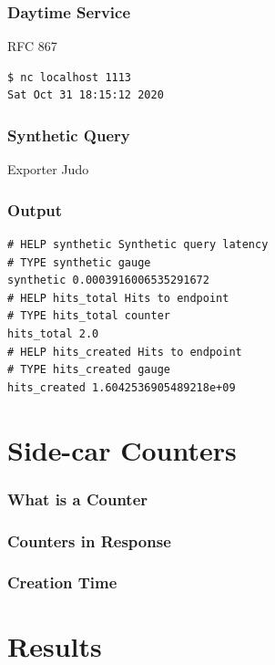 \begin{frame}[fragile]
\frametitle{Daytime Service}
RFC 867\pause

\begin{lstlisting}
$ nc localhost 1113
Sat Oct 31 18:15:12 2020
\end{lstlisting}

\end{frame}

\begin{frame}[fragile]
\frametitle{Synthetic Query}
Exporter Judo\pause



\end{frame}

\begin{frame}[fragile]
\frametitle{Output}

\begin{lstlisting}
# HELP synthetic Synthetic query latency
# TYPE synthetic gauge
synthetic 0.0003916006535291672
# HELP hits_total Hits to endpoint
# TYPE hits_total counter
hits_total 2.0
# HELP hits_created Hits to endpoint
# TYPE hits_created gauge
hits_created 1.6042536905489218e+09
\end{lstlisting}

\end{frame}

\section{Side-car Counters}

\begin{frame}
\frametitle{What is a Counter}
\end{frame}

\begin{frame}
\frametitle{Counters in Response}
\end{frame}

\begin{frame}
\frametitle{Creation Time}
\end{frame}

\section{Results}

